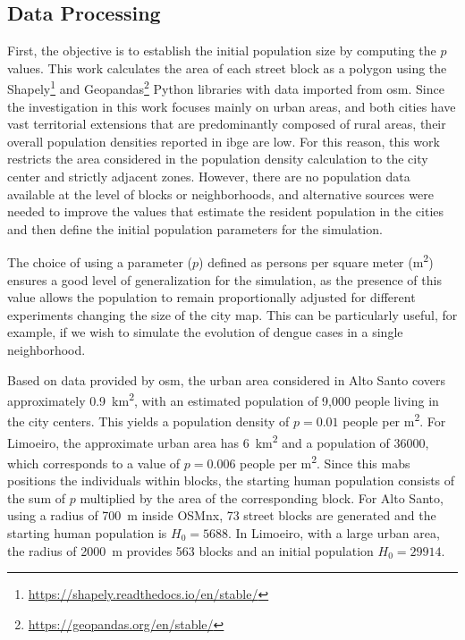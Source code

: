 \subsection{Data Processing}\label{subsec:data-processing}

First, the objective is to establish the initial population size by computing
the $p$ values. This work calculates the area of each street block as a polygon
using the Shapely\footnote{\url{https://shapely.readthedocs.io/en/stable/}} and
Geopandas\footnote{\url{https://geopandas.org/en/stable/}} Python libraries with
data imported from \gls{osm}. Since the investigation in this work focuses
mainly on urban areas, and both cities have vast territorial extensions that are
predominantly composed of rural areas, their overall population densities
reported in \gls{ibge} are low. For this reason, this work restricts the area
considered in the population density calculation to the city center and strictly
adjacent zones. However, there are no population data available at the level of
blocks or neighborhoods, and alternative sources were needed to improve the
values that estimate the resident population in the cities and then define the
initial population parameters for the simulation.

The choice of using a parameter ($p$) defined as persons per square meter
(m\textsuperscript{2}) ensures a good level of generalization for the
simulation, as the presence of this value allows the population to remain
proportionally adjusted for different experiments changing the size of the city
map. This can be particularly useful, for example, if we wish to simulate the
evolution of dengue cases in a single neighborhood.

Based on data provided by \gls{osm}, the urban area considered in Alto Santo
covers approximately 0.9~km\textsuperscript{2}, with an estimated population of
9,000 people living in the city centers. This yields a population density of $p
	= 0.01$ people per m\textsuperscript{2}. For Limoeiro, the approximate urban
area has 6~km\textsuperscript{2} and a population of 36000, which corresponds to
a value of \( p = 0.006 \) people per m\textsuperscript{2}. Since this
\gls{mabs} positions the individuals within blocks, the starting human
population consists of the sum of $p$ multiplied by the area of the
corresponding block. For Alto Santo, using a radius of 700~m inside OSMnx, 73
street blocks are generated and the starting human population is $H_0 = 5688$.
In Limoeiro, with a large urban area, the radius of 2000~m provides 563 blocks
and an initial population $H_0 = 29914$.

